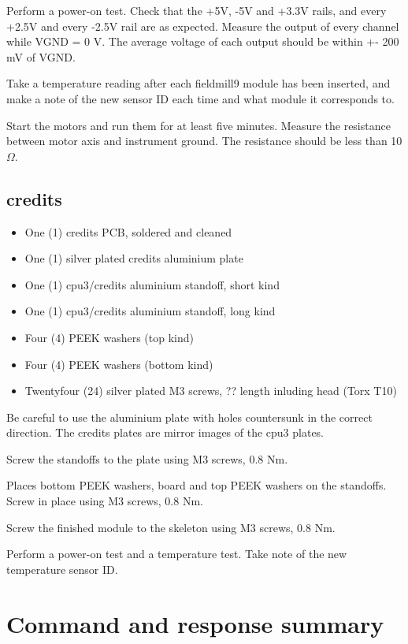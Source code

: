 \documentclass{article}
\begin{document}
Perform a power-on test.
Check that the +5V, -5V and +3.3V rails, and every +2.5V and every -2.5V rail are as expected.
Measure the output of every channel while VGND = 0 V. The average voltage of each output should be within +- 200 mV of VGND.

Take a temperature reading after each fieldmill9 module has been inserted,
and make a note of the new sensor ID each time and what module it corresponds to.

Start the motors and run them for at least five minutes.
Measure the resistance between motor axis and instrument ground.
The resistance should be less than 10 $\Omega$.

\subsection{credits}

\begin{itemize}
\item One (1) credits PCB, soldered and cleaned
\item One (1) silver plated credits aluminium plate
\item One (1) cpu3/credits aluminium standoff, short kind
\item One (1) cpu3/credits aluminium standoff, long kind
\item Four (4) PEEK washers (top kind)
\item Four (4) PEEK washers (bottom kind)
\item Twentyfour (24) silver plated M3 screws, ?? length inluding head (Torx T10)
\end{itemize}

Be careful to use the aluminium plate with holes countersunk in the correct direction.
The credits plates are mirror images of the cpu3 plates.

Screw the standoffs to the plate using M3 screws, 0.8 Nm.

Places bottom PEEK washers, board and top PEEK washers on the standoffs.
Screw in place using M3 screws, 0.8 Nm.

Screw the finished module to the skeleton using M3 screws, 0.8 Nm.

Perform a power-on test and a temperature test.
Take note of the new temperature sensor ID.

\section{Command and response summary}
\end{document}
